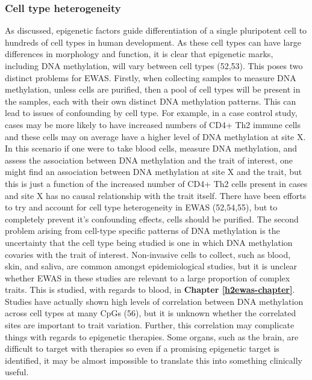 \documentclass[11pt,twoside]{bristolthesis}
\begin{document}
\hypertarget{cell-type-heterogeneity}{%
\subsubsection{Cell type heterogeneity}\label{cell-type-heterogeneity}}

As discussed, epigenetic factors guide differentiation of a single pluripotent cell to hundreds of cell types in human development. As these cell types can have large differences in morphology and function, it is clear that epigenetic marks, including DNA methylation, will vary between cell types (52,53). This poses two distinct problems for EWAS. Firstly, when collecting samples to measure DNA methylation, unless cells are purified, then a pool of cell types will be present in the samples, each with their own distinct DNA methylation patterns. This can lead to issues of confounding by cell type. For example, in a case control study, cases may be more likely to have increased numbers of CD4+ Th2 immune cells and these cells may on average have a higher level of DNA methylation at site X. In this scenario if one were to take blood cells, measure DNA methylation, and assess the association between DNA methylation and the trait of interest, one might find an association between DNA methylation at site X and the trait, but this is just a function of the increased number of CD4+ Th2 cells present in cases and site X has no causal relationship with the trait itself. There have been efforts to try and account for cell type heterogeneity in EWAS (52,54,55), but to completely prevent it's confounding effects, cells should be purified. The second problem arising from cell-type specific patterns of DNA methylation is the uncertainty that the cell type being studied is one in which DNA methylation covaries with the trait of interest. Non-invasive cells to collect, such as blood, skin, and saliva, are common amongst epidemiological studies, but it is unclear whether EWAS in these studies are relevant to a large proportion of complex traits. This is studied, with regards to blood, in \textbf{Chapter \ref{h2ewas-chapter}}. Studies have actually shown high levels of correlation between DNA methylation across cell types at many CpGs (56), but it is unknown whether the correlated sites are important to trait variation. Further, this correlation may complicate things with regards to epigenetic therapies. Some organs, such as the brain, are difficult to target with therapies so even if a promising epigenetic target is identified, it may be almost impossible to translate this into something clinically useful.
\end{document}
